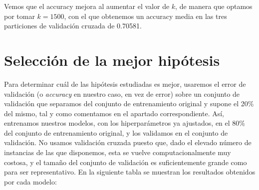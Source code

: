 \documentclass[a4]{article}
\begin{document}
\begin{figure}[H]
    \centering
	\label{fig:rbf}
\end{figure}


Vemos que el accuracy mejora al aumentar el valor de $k$, de manera que optamos por tomar $k=1500$, con el que obtenemos un accuracy media en las tres particiones de validación cruzada de 0.70581. 


\section{Selección de la mejor hipótesis}

Para determinar cuál de las hipótesis estudiadas es mejor, usaremos el error de validación (o \textit{accuracy} en nuestro caso, en vez de error) sobre un conjunto de validación que separamos del conjunto de entrenamiento original y supone el 20\% del mismo, tal y como comentamos en el apartado correspondiente. Así, entrenamos nuestros modelos, con los hiperparámetros ya ajustados, en el 80\% del conjunto de entrenamiento original, y los validamos en el conjunto de validación. No usamos validación cruzada puesto que, dado el elevado número de instancias de las que disponemos, esta se vuelve computacionalmente muy costosa, y el tamaño del conjunto de validación es suficientemente grande como para ser representativo. En la siguiente tabla se muestran los resultados obtenidos por cada modelo:
\end{document}
